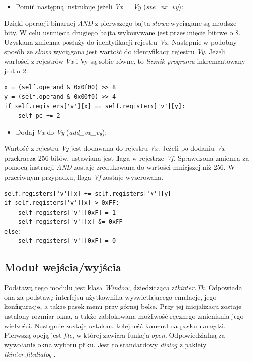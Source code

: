 \begin{itemize}
  \item Pomiń następną instrukcje jeżeli \textit{Vx==Vy} (\textit{sne\_vx\_vy}):
\end{itemize}
Dzięki operacji binarnej \textit{AND} z pierwszego bajta \textit{słowa} wyciągane są młodsze bity. W celu usunięcia drugiego bajta wykonywane jest przesunięcie bitowe o 8. Uzyskana zmienna posłuży do identyfikacji rejestru \textit{Vx}. Następnie w podobny sposób ze \textit{słowa} wyciągana jest wartość do identyfikacji rejestru \textit{Vy}. Jeżeli wartości z rejestrów \textit{Vx} i V{y} są sobie równe, to \textit{licznik programu} inkrementowany jest o 2.
\begin{lstlisting}[caption={Implementacja instrukcji \textit{sne\_vx\_vy}},captionpos=b]
x = (self.operand & 0x0f00) >> 8
y = (self.operand & 0x00f0) >> 4
if self.registers['v'][x] == self.registers['v'][y]:
    self.pc += 2
\end{lstlisting}

\begin{itemize}
  \item Dodaj \textit{Vx} do \textit{Vy} (\textit{add\_vx\_vy}):
\end{itemize}
Wartość z rejestru \textit{Vy} jest dodawana do rejestru \textit{Vx}. Jeżeli po dodaniu \textit{Vx} przekracza 256 bitów, ustawiana jest flaga w rejestrze \textit{Vf}. Sprawdzona zmienna za pomocą instrucji \textit{AND} zostaje zredukowana do wartości mniejszej niż 256. W przeciwnym przypadku, flaga \textit{Vf} zostaje wyzerowana.
\begin{lstlisting}[caption={Implementacja instrukcji \textit{add\_vx\_vy}},captionpos=b]
self.registers['v'][x] += self.registers['v'][y]
if self.registers['v'][x] > 0xFF:
    self.registers['v'][0xF] = 1
    self.registers['v'][x] &= 0xFF
else:
	self.registers['v'][0xF] = 0
\end{lstlisting}


\newpage

\subsection{Moduł wejścia/wyjścia}
Podstawą tego modułu jest klasa \textit{Window}, dziedzicząca z\textit{tkinter.Tk}. Odpowiada ona za podstawę interfejsu użytkownika wyświetlającego emulacje, jego konfiguracje, a także pasek menu przy górnej belce. Przy jej inicjalizacji zostaje ustalony rozmiar okna, a także zablokowana możliwość ręcznego zmieniania jego wielkości. Następnie zostaje ustalona kolejność komend na pasku narzędzi. Pierwszą opcją jest \textit{file}, w której zawiera funkcja \textit{open}. Odpowiedzialną za wywołanie okna wyboru pliku. Jest to standardowy \textit{dialog} z pakiety \textit{tkinter.filedialog} \cite{TKINTER}.

